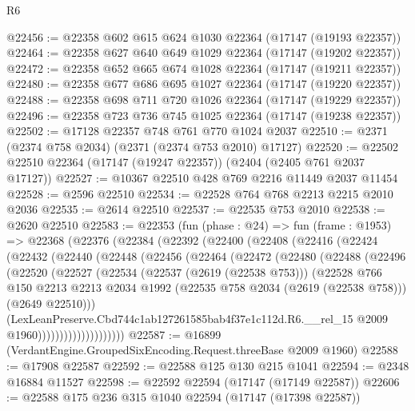 \begin{lexlean}{R6}
\begin{coremodule}
@22456 := @22358 @602 @615 @624 @1030 @22364 (@17147 (@19193 @22357))
@22464 := @22358 @627 @640 @649 @1029 @22364 (@17147 (@19202 @22357))
@22472 := @22358 @652 @665 @674 @1028 @22364 (@17147 (@19211 @22357))
@22480 := @22358 @677 @686 @695 @1027 @22364 (@17147 (@19220 @22357))
@22488 := @22358 @698 @711 @720 @1026 @22364 (@17147 (@19229 @22357))
@22496 := @22358 @723 @736 @745 @1025 @22364 (@17147 (@19238 @22357))
@22502 := @17128 @22357 @748 @761 @770 @1024 @2037
@22510 := @2371 (@2374 @758 @2034) (@2371 (@2374 @753 @2010) @17127)
@22520 := @22502 @22510 @22364 (@17147 (@19247 @22357)) (@2404 (@2405 @761 @2037 @17127))
@22527 := @10367 @22510 @428 @769 @2216 @11449 @2037 @11454
@22528 := @2596 @22510
@22534 := @22528 @764 @768 @2213 @2215 @2010 @2036
@22535 := @2614 @22510
@22537 := @22535 @753 @2010
@22538 := @2620 @22510
@22583 := @22353
    (fun (phase : @24) =>
    fun (frame : @1953) =>
    @22368
      (@22376
        (@22384
          (@22392
            (@22400
              (@22408
                (@22416
                  (@22424
                    (@22432
                      (@22440
                        (@22448
                          (@22456
                            (@22464
                              (@22472
                                (@22480
                                  (@22488
                                    (@22496
                                      (@22520
                                        (@22527
                                          (@22534
                                            (@22537 (@2619 (@22538 @753)))
                                            (@22528
                                              @766
                                              @150
                                              @2213
                                              @2213
                                              @2034
                                              @1992
                                              (@22535 @758 @2034 (@2619 (@22538 @758)))
                                              (@2649 @22510)))
                                          (LexLeanPreserve.Cbd744c1ab127261585bab4f37e1c112d.R6.__rel_15
                                            @2009
                                            @1960))))))))))))))))))))
@22587 := @16899 (VerdantEngine.GroupedSixEncoding.Request.threeBase @2009 @1960)
@22588 := @17908 @22587
@22592 := @22588 @125 @130 @215 @1041
@22594 := @2348 @16884 @11527
@22598 := @22592 @22594 (@17147 (@17149 @22587))
@22606 := @22588 @175 @236 @315 @1040 @22594 (@17147 (@17398 @22587))

\end{coremodule}
\end{lexlean}

